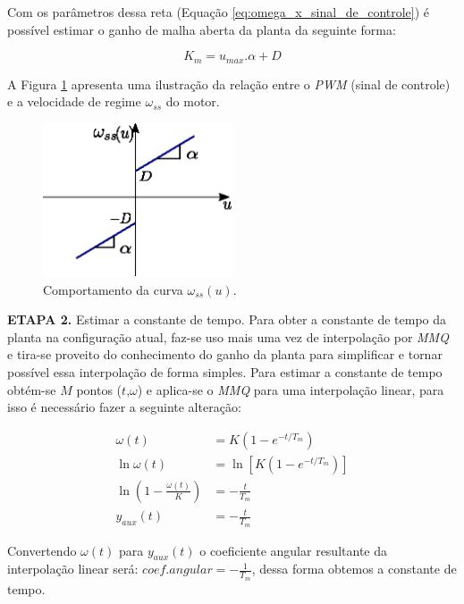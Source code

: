 Com os parâmetros dessa reta (Equação \ref{eq:omega_x_sinal_de_controle}) é possível estimar o ganho de malha aberta da planta da seguinte forma:

\begin{equation}
    K_m = u_{max}.\alpha + D
\end{equation}

A Figura \ref{fig:ilustracao_omega_x_pwm} apresenta uma ilustração da relação entre o \emph{PWM} (sinal de controle) e a velocidade de regime $\omega_{ss}$ do motor.

\begin{figure}[H]
    \centering
    \includegraphics[width=0.5\textwidth]{figuras/ilustracoes/omega_x_sinal_controle.eps}
    \caption{Comportamento da curva $\omega_{ss}(u)$.}
    \label{fig:ilustracao_omega_x_pwm}
\end{figure}

    
\textbf{ETAPA 2.} Estimar a constante de tempo. Para obter a constante de tempo da planta na configuração atual, faz-se uso mais uma vez de interpolação por \textit{MMQ} e tira-se proveito do conhecimento do ganho da planta para simplificar e tornar possível essa interpolação de forma simples. Para estimar a constante de tempo obtém-se $M$ pontos ($t$,$\omega$) e aplica-se o \textit{MMQ} para uma interpolação linear, para isso é necessário fazer a seguinte alteração:
    

\begin{align*}
    \omega(t) &= K\left( 1 - e^{-t/T_m} \right)\\
    \ln{\omega(t)} &= \ln\left[K( 1 - e^{-t/T_m})\right]\\
    \ln\left(1 - \frac{\omega(t)}{K} \right) &= -\frac{t}{T_m}\\
    y_{aux}(t) &= -\frac{t}{T_m}
\end{align*}

Convertendo $\omega(t)$ para $y_{aux}(t)$ o coeficiente angular resultante da interpolação linear será: $coef.angular = -\frac{1}{T_m}$, dessa forma obtemos a constante de tempo.\\

